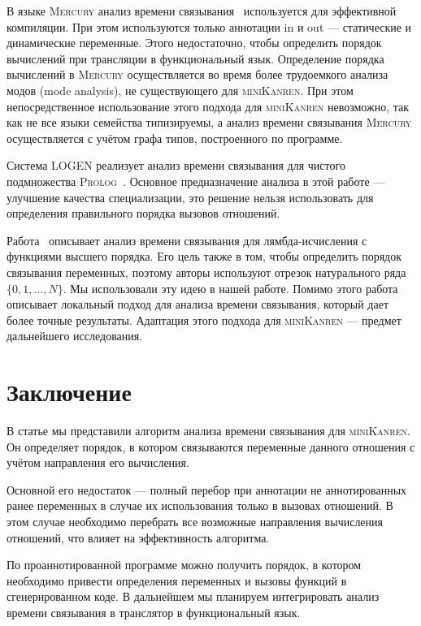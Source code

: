 \documentclass[conference,a4paper,american,russian]{IEEEtran}
\newcommand{\miniKanren}{\textsc{miniKanren}}
\newcommand{\mercury}{\textsc{Mercury}}
\newcommand{\prolog}{\textsc{Prolog}}
\newcommand{\logen}{\textsc{LOGEN}}
\begin{document}
В языке \mercury{} анализ времени связывания~\cite{vanhoof2004binding} используется для эффективной компиляции.
При этом используются только аннотации in и out --- статические и динамические переменные.
Этого недостаточно, чтобы определить порядок вычислений при трансляции в функциональный язык.
Определение порядка вычислений в \mercury{} осуществляется во время более трудоемкого анализа модов (mode analysis), не существующего для \miniKanren{}.
При этом непосредственное использование этого подхода для \miniKanren{} невозможно, так как не все языки семейства типизируемы, а анализ времени связывания \mercury{} осуществляется с учётом графа типов, построенного по программе.

Система \logen{} реализует анализ времени связывания для чистого подмножества \prolog{}~\cite{leuschel2004prolog}.
Основное предназначение анализа в этой работе --- улучшение качества специализации, это решение нельзя использовать для определения правильного порядка вызовов отношений.

Работа~\cite{Thiemann1997AUF} описывает анализ времени связывания для лямбда-исчисления с функциями высшего порядка.
Его цель также в том, чтобы определить порядок связывания переменных, поэтому авторы используют отрезок натурального ряда $\{ 0, 1, \dots, N\}$.
Мы использовали эту идею в нашей работе.
Помимо этого работа~\cite{Thiemann1997AUF} описывает локальный подход для анализа времени связывания, который дает более точные результаты.
Адаптация этого подхода для \miniKanren{} --- предмет дальнейшего исследования.

\section{Заключение}\label{conclusion}

В статье мы представили алгоритм анализа времени связывания для \miniKanren{}.
Он определяет порядок, в котором связываются переменные данного отношения с учётом направления его вычисления.

Основной его недостаток --- полный перебор при аннотации не аннотированных ранее переменных в случае их использования только в вызовах отношений.
В этом случае необходимо перебрать все возможные направления вычисления отношений, что влияет на эффективность алгоритма.

По проаннотированной программе можно получить порядок, в котором необходимо привести определения переменных и вызовы функций в сгенерированном коде. В дальнейшем мы планируем интегрировать анализ времени связывания в транслятор в функциональный язык.



\balance




\newpage


\end{document}

